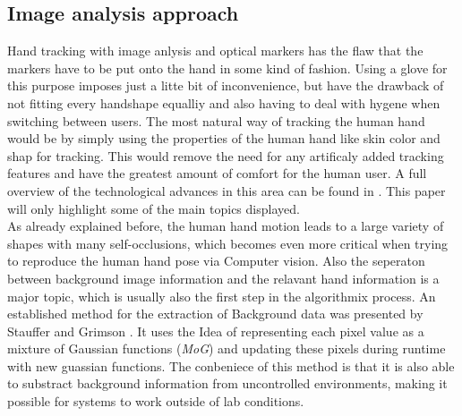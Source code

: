 \subsection{Image analysis approach}
Hand tracking with image anlysis and optical markers has the flaw that the markers have to be put onto the hand in some kind of fashion. Using a glove for this purpose imposes just a litte bit of inconvenience, but have the drawback of not fitting every handshape equalliy and also having to deal with hygene when switching between users. The most natural way of tracking the human hand would be by simply using the properties of the human hand like skin color and shap for tracking. This would remove the need for any artificaly added tracking features and have the greatest amount of comfort for the human user.
A full overview of the technological advances in this area can be found in \cite{Moeslund.2006,Moeslund.2001}. This paper will only highlight some of the main topics displayed.\\
As already explained before, the human hand motion leads to a large variety of shapes with many self-occlusions, which becomes even more critical when trying to reproduce the human hand pose via Computer vision. Also the seperaton between background image information and the relavant hand information is a major topic, which is usually also the first step in the algorithmix process.
An established method for the extraction of Background data was presented by Stauffer and Grimson \cite{Stauffer.1999}. It uses the Idea of representing  each pixel value as a mixture of Gaussian functions (\textit{MoG}) and updating these pixels during runtime with new guassian functions. The conbeniece of this method is that it is also able to substract background information from uncontrolled environments, making it possible for systems to work outside of lab conditions.






